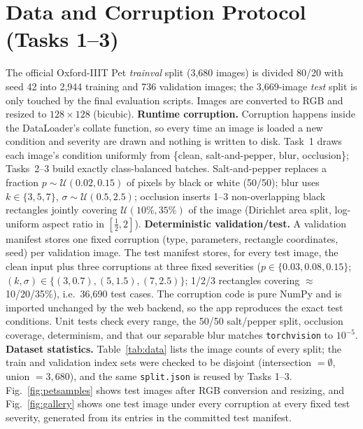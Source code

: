 \documentclass[conference]{IEEEtran}
\begin{document}
\section{Data and Corruption Protocol (Tasks 1--3)}
The official Oxford-IIIT Pet \emph{trainval} split (3{,}680 images) is divided 80/20 with seed 42 into 2{,}944 training and 736 validation images; the 3{,}669-image \emph{test} split is only touched by the final evaluation scripts. Images are converted to RGB and resized to $128\times128$ (bicubic).
\textbf{Runtime corruption.} Corruption happens inside the DataLoader's collate function, so every time an image is loaded a new condition and severity are drawn and nothing is written to disk. Task~1 draws each image's condition uniformly from \{clean, salt-and-pepper, blur, occlusion\}; Tasks~2--3 build exactly class-balanced batches. Salt-and-pepper replaces a fraction $p\sim\mathcal U(0.02,0.15)$ of pixels by black or white (50/50); blur uses $k\in\{3,5,7\}$, $\sigma\sim\mathcal U(0.5,2.5)$; occlusion inserts 1--3 non-overlapping black rectangles jointly covering $\mathcal U(10\%,35\%)$ of the image (Dirichlet area split, log-uniform aspect ratio in $[\frac12,2]$).
\textbf{Deterministic validation/test.} A validation manifest stores one fixed corruption (type, parameters, rectangle coordinates, seed) per validation image. The test manifest stores, for every test image, the clean input plus three corruptions at three fixed severities ($p\in\{0.03,0.08,0.15\}$; $(k,\sigma)\in\{(3,0.7),(5,1.5),(7,2.5)\}$; 1/2/3 rectangles covering $\approx$10/20/35\%), i.e.\ 36{,}690 test cases. The corruption code is pure NumPy and is imported unchanged by the web backend, so the app reproduces the exact test conditions. Unit tests check every range, the 50/50 salt/pepper split, occlusion coverage, determinism, and that our separable blur matches \texttt{torchvision} to $10^{-5}$.
\textbf{Dataset statistics.} Table~\ref{tab:data} lists the image counts of every split; the train and validation index sets were checked to be disjoint (intersection $=\emptyset$, union $=3{,}680$), and the same \texttt{split.json} is reused by Tasks 1--3. Fig.~\ref{fig:petsamples} shows test images after RGB conversion and resizing, and Fig.~\ref{fig:gallery} shows one test image under every corruption at every fixed test severity, generated from its entries in the committed test manifest.
\end{document}
